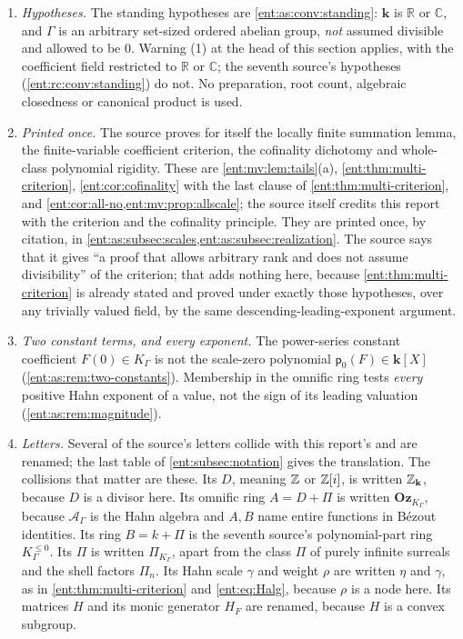 \documentclass[11pt]{article}
\theoremstyle{plain}
\theoremstyle{plain}
\theoremstyle{plain}
\theoremstyle{definition}
\theoremstyle{definition}
\theoremstyle{definition}
\theoremstyle{definition}
\theoremstyle{remark}
\newcommand{\C}{\mathbb C}\newcommand{\R}{\mathbb R}
\newcommand{\K}{K_\Gamma}\newcommand{\KD}{K_\Delta}
\newcommand{\A}{\mathcal A_\Gamma}\newcommand{\OO}{\mathcal O_\Gamma}
\newcommand{\kk}{\mathbf k}\newcommand{\PP}{\mathbb P}
\newcommand{\Oz}{\mathbf{Oz}}\newcommand{\Ed}{\mathcal E_{\Gamma,d}}
\newcommand{\Kle}{K_\Gamma^{\le0}}\DeclareMathOperator{\Jac}{Jac}
\newcommand{\Zk}{\Z_{\kk}}\newcommand{\OzK}{\Oz_{\K}}
\newcommand{\PiK}{\Pi_{\K}}\newcommand{\pg}{\mathsf p}
\begin{document}
\begin{enumerate}[label=(\arabic*),leftmargin=2em]
\item \emph{Hypotheses.} The standing hypotheses are
\cref{ent:as:conv:standing}: $\kk$ is $\R$ or $\C$, and $\Gamma$ is an
arbitrary set-sized ordered abelian group, \emph{not} assumed divisible and
allowed to be $0$. Warning (1) at the head of this section applies, with the
coefficient field restricted to $\R$ or $\C$; the seventh source's hypotheses
(\cref{ent:rc:conv:standing}) do not. No preparation, root count, algebraic
closedness or canonical product is used.
\item \emph{Printed once.} The source proves for itself the locally finite
summation lemma, the finite-variable coefficient criterion, the cofinality
dichotomy and whole-class polynomial rigidity. These are
\cref{ent:mv:lem:tails}(a), \cref{ent:thm:multi-criterion},
\cref{ent:cor:cofinality} with the last clause of
\cref{ent:thm:multi-criterion}, and \cref{ent:cor:all-no,ent:mv:prop:allscale};
the source itself credits this report with the criterion and the cofinality
principle. They are printed once, by citation, in
\cref{ent:as:subsec:scales,ent:as:subsec:realization}. The source says that it
gives ``a proof that allows arbitrary rank and does not assume divisibility''
of the criterion; that adds nothing here, because
\cref{ent:thm:multi-criterion} is already stated and proved under exactly
those hypotheses, over any trivially valued field, by the same
descending-leading-exponent argument.
\item \emph{Two constant terms, and every exponent.} The power-series constant
coefficient $F(0)\in\K$ is not the scale-zero polynomial $\pg_0(F)\in\kk[X]$
(\cref{ent:as:rem:two-constants}). Membership in the omnific ring tests
\emph{every} positive Hahn exponent of a value, not the sign of its leading
valuation (\cref{ent:as:rem:magnitude}).
\item \emph{Letters.} Several of the source's letters collide with this
report's and are renamed; the last table of \cref{ent:subsec:notation} gives
the translation. The collisions that matter are these. Its $D$, meaning $\mathbb Z$
or $\mathbb Z[i]$, is written $\Zk$, because $D$ is a divisor here. Its omnific ring
$A=D+\Pi$ is written $\OzK$, because $\A$ is the Hahn algebra and $A,B$ name
entire functions in B\'ezout identities. Its ring $B=k+\Pi$ is the seventh
source's polynomial-part ring $\Kle$. Its $\Pi$ is written $\PiK$, apart from
the class $\Pi$ of purely infinite surreals and the shell factors $\Pi_n$. Its
Hahn scale $\gamma$ and weight $\rho$ are written $\eta$ and $\gamma$, as in
\cref{ent:thm:multi-criterion} and \eqref{ent:eq:Halg}, because $\rho$ is a node
here. Its matrices $H$ and its monic generator $H_F$ are renamed, because $H$
is a convex subgroup.
\end{enumerate}
\end{document}
